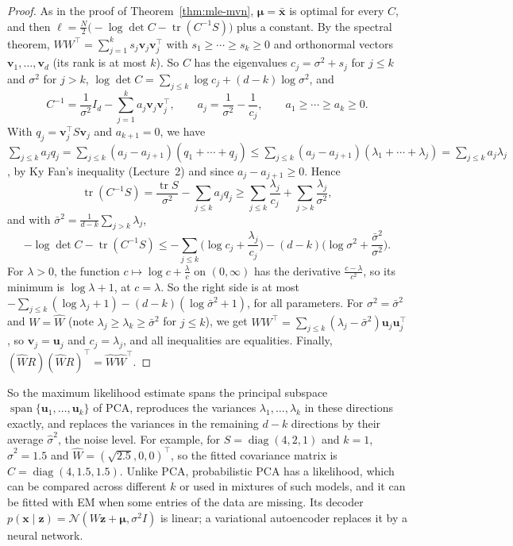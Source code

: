\documentclass[11pt]{article}
\theoremstyle{definition}
\theoremstyle{plain}
\theoremstyle{remark}
\DeclareMathOperator{\Span}{span}
\DeclareMathOperator{\tr}{tr}
\DeclareMathOperator{\diag}{diag}
\begin{document}
\begin{proof}
    As in the proof of Theorem~\ref{thm:mle-mvn}, $\boldsymbol{\mu} = \bar{\mathbf{x}}$ is optimal for every $C$, and then $\ell = \frac{N}{2}\big(-\log\det C - \tr(C^{-1}S)\big)$ plus a constant. By the spectral theorem, $WW^\top = \sum_{j=1}^k s_j\mathbf{v}_j\mathbf{v}_j^\top$ with $s_1 \geq \cdots \geq s_k \geq 0$ and orthonormal vectors $\mathbf{v}_1, \ldots, \mathbf{v}_d$ (its rank is at most $k$). So $C$ has the eigenvalues $c_j = \sigma^2 + s_j$ for $j \leq k$ and $\sigma^2$ for $j > k$, $\log\det C = \sum_{j \leq k}\log c_j + (d - k)\log\sigma^2$, and
    \[C^{-1} = \frac{1}{\sigma^2}I_d - \sum_{j=1}^k a_j\mathbf{v}_j\mathbf{v}_j^\top, \qquad a_j = \frac{1}{\sigma^2} - \frac{1}{c_j}, \qquad a_1 \geq \cdots \geq a_k \geq 0.\]
    With $q_j = \mathbf{v}_j^\top S\mathbf{v}_j$ and $a_{k+1} = 0$, we have $\sum_{j \leq k} a_jq_j = \sum_{j \leq k}(a_j - a_{j+1})(q_1 + \cdots + q_j) \leq \sum_{j \leq k}(a_j - a_{j+1})(\lambda_1 + \cdots + \lambda_j) = \sum_{j \leq k} a_j\lambda_j$, by Ky Fan's inequality (Lecture~2) and since $a_j - a_{j+1} \geq 0$. Hence
    \[\tr(C^{-1}S) = \frac{\tr S}{\sigma^2} - \sum_{j \leq k} a_jq_j \geq \sum_{j \leq k}\frac{\lambda_j}{c_j} + \sum_{j > k}\frac{\lambda_j}{\sigma^2},\]
    and with $\bar\sigma^2 = \frac{1}{d - k}\sum_{j > k}\lambda_j$,
    \[-\log\det C - \tr(C^{-1}S) \leq -\sum_{j \leq k}\Big(\log c_j + \frac{\lambda_j}{c_j}\Big) - (d - k)\Big(\log\sigma^2 + \frac{\bar\sigma^2}{\sigma^2}\Big).\]
    For $\lambda > 0$, the function $c \mapsto \log c + \frac{\lambda}{c}$ on $(0, \infty)$ has the derivative $\frac{c - \lambda}{c^2}$, so its minimum is $\log\lambda + 1$, at $c = \lambda$. So the right side is at most $-\sum_{j \leq k}(\log\lambda_j + 1) - (d - k)(\log\bar\sigma^2 + 1)$, for all parameters. For $\sigma^2 = \bar\sigma^2$ and $W = \hat W$ (note $\lambda_j \geq \lambda_k \geq \bar\sigma^2$ for $j \leq k$), we get $WW^\top = \sum_{j \leq k}(\lambda_j - \bar\sigma^2)\mathbf{u}_j\mathbf{u}_j^\top$, so $\mathbf{v}_j = \mathbf{u}_j$ and $c_j = \lambda_j$, and all inequalities are equalities. Finally, $(\hat WR)(\hat WR)^\top = \hat W\hat W^\top$.
\end{proof}

So the maximum likelihood estimate spans the principal subspace $\Span\{\mathbf{u}_1, \ldots, \mathbf{u}_k\}$ of PCA, reproduces the variances $\lambda_1, \ldots, \lambda_k$ in these directions exactly, and replaces the variances in the remaining $d - k$ directions by their average $\hat\sigma^2$, the noise level. For example, for $S = \diag(4, 2, 1)$ and $k = 1$, $\hat\sigma^2 = 1.5$ and $\hat W = (\sqrt{2.5}, 0, 0)^\top$, so the fitted covariance matrix is $\hat C = \diag(4, 1.5, 1.5)$. Unlike PCA, probabilistic PCA has a likelihood, which can be compared across different $k$ or used in mixtures of such models, and it can be fitted with EM when some entries of the data are missing. Its decoder $p(\mathbf{x} \mid \mathbf{z}) = \mathcal{N}(W\mathbf{z} + \boldsymbol{\mu}, \sigma^2I)$ is linear; a variational autoencoder replaces it by a neural network.
\end{document}
